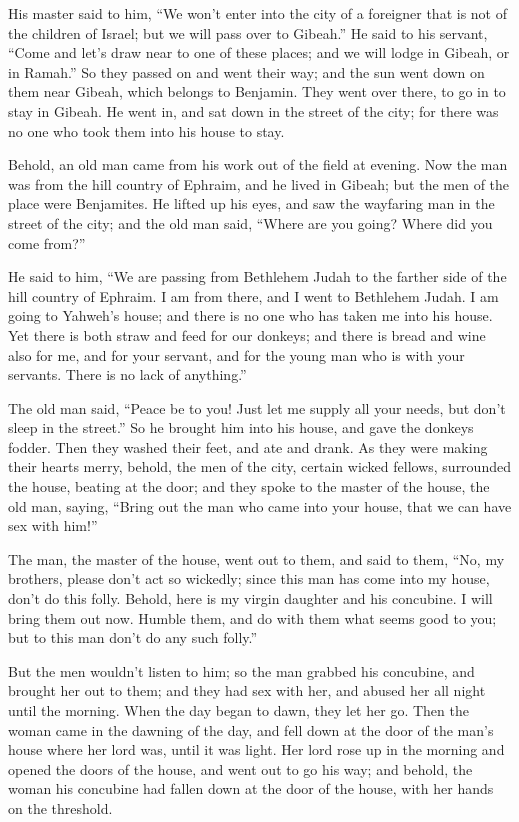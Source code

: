  His master said to him, ``We won't enter into the city
of a foreigner that is not of the children of Israel; but we will pass
over to Gibeah.''  He said to his servant, ``Come and
let's draw near to one of these places; and we will lodge in Gibeah, or
in Ramah.''  So they passed on and went their way; and
the sun went down on them near Gibeah, which belongs to Benjamin.
 They went over there, to go in to stay in Gibeah. He
went in, and sat down in the street of the city; for there was no one
who took them into his house to stay.

 Behold, an old man came from his work out of the field
at evening. Now the man was from the hill country of Ephraim, and he
lived in Gibeah; but the men of the place were Benjamites.
 He lifted up his eyes, and saw the wayfaring man in the
street of the city; and the old man said, ``Where are you going? Where
did you come from?''

 He said to him, ``We are passing from Bethlehem Judah to
the farther side of the hill country of Ephraim. I am from there, and I
went to Bethlehem Judah. I am going to Yahweh's house; and there is no
one who has taken me into his house.  Yet there is both
straw and feed for our donkeys; and there is bread and wine also for me,
and for your servant, and for the young man who is with your servants.
There is no lack of anything.''

 The old man said, ``Peace be to you! Just let me supply
all your needs, but don't sleep in the street.''  So he
brought him into his house, and gave the donkeys fodder. Then they
washed their feet, and ate and drank.  As they were
making their hearts merry, behold, the men of the city, certain wicked
fellows, surrounded the house, beating at the door; and they spoke to
the master of the house, the old man, saying, ``Bring out the man who
came into your house, that we can have sex with him!''

 The man, the master of the house, went out to them, and
said to them, ``No, my brothers, please don't act so wickedly; since
this man has come into my house, don't do this folly. 
Behold, here is my virgin daughter and his concubine. I will bring them
out now. Humble them, and do with them what seems good to you; but to
this man don't do any such folly.''

 But the men wouldn't listen to him; so the man grabbed
his concubine, and brought her out to them; and they had sex with her,
and abused her all night until the morning. When the day began to dawn,
they let her go.  Then the woman came in the dawning of
the day, and fell down at the door of the man's house where her lord
was, until it was light.  Her lord rose up in the morning
and opened the doors of the house, and went out to go his way; and
behold, the woman his concubine had fallen down at the door of the
house, with her hands on the threshold.

